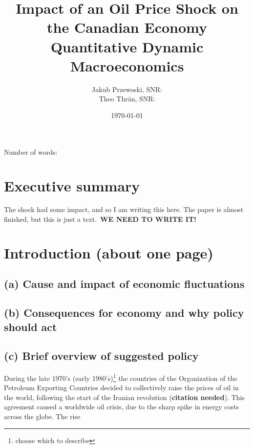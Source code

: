 \documentclass[12pt]{article}
\title{\textbf{Impact of an Oil Price Shock on the Canadian Economy} \\ \large{Quantitative Dynamic Macroeconomics}}
\author{Jakub Przewoski, SNR: \\ Theo Thrän, SNR: }
\date{\today}
\begin{document}
\maketitle
\vfill{}
\begin{center}
    \large
    Number of words:
\end{center}
\newpage

\section{Executive summary}
The shock had some impact, and so I am writing this here. The paper is almost finished, but this is just a text.\ \textbf{WE NEED TO WRITE IT!}

\newpage
\section{Introduction (about one page)}
\subsection*{(a) Cause and impact of economic fluctuations}

\subsection*{(b) Consequences for economy and why policy should act}

\subsection*{(c) Brief overview of suggested policy}

During the late 1970's (early 1980's)\footnote{choose which to describe} the countries of the Organization of the Petroleum Exporting Countries decided to collectively raise the prices of oil in the world, following the start of the Iranian revolution (\textbf{citation needed}). This agreement caused a worldwide oil crisis, due to the sharp spike in energy costs across the globe. The rise



\newpage
\end{document}
